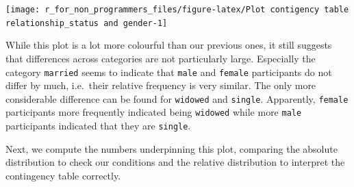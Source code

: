 \documentclass[
]{book}
\begin{document}
\begin{center}\texttt{[image: r\_for\_non\_programmers\_files/figure-latex/Plot contigency table relationship\_status and gender-1]} \end{center}

While this plot is a lot more colourful than our previous ones, it still suggests that differences across categories are not particularly large. Especially the category \texttt{married} seems to indicate that \texttt{male} and \texttt{female} participants do not differ by much, i.e.~their relative frequency is very similar. The only more considerable difference can be found for \texttt{widowed} and \texttt{single}. Apparently, \texttt{female} participants more frequently indicated being \texttt{widowed} while more \texttt{male} participants indicated that they are \texttt{single}.

Next, we compute the numbers underpinning this plot, comparing the absolute distribution to check our conditions and the relative distribution to interpret the contingency table correctly.
\end{document}
